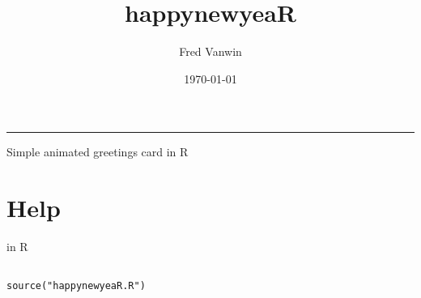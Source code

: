 \documentclass[11pt]{article}
\author{Fred Vanwin}
\date{\today}
\title{happynewyeaR}
\begin{document}
\maketitle
\tableofcontents


\noindent\rule{\textwidth}{0.5pt}

Simple animated greetings card in R

\section{Help}
\label{sec:orgc31edba}
in R

\begin{verbatim}

source("happynewyeaR.R")

\end{verbatim}
\end{document}
